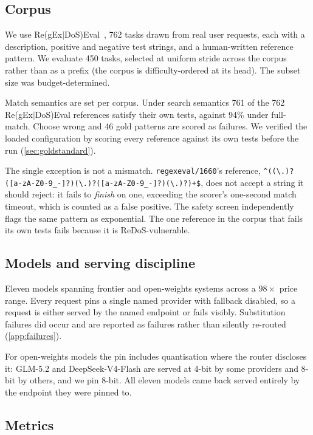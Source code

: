 \documentclass[11pt]{article}
\begin{document}
\subsection{Corpus}

We use Re(gEx$|$DoS)Eval~\citep{siddiq2024regexeval}, 762 tasks drawn from real user
requests, each with a description, positive and negative test strings, and a
human-written reference pattern. We evaluate 450 tasks, selected at uniform
stride across the corpus rather than as a prefix (the corpus is
difficulty-ordered at its head). The subset size was budget-determined.

Match semantics are set per corpus. Under search semantics 761 of the 762
Re(gEx$|$DoS)Eval references satisfy their own tests, against 94\% under
full-match. Choose wrong and 46 gold patterns are scored as failures. We
verified the loaded configuration by scoring every reference against its own
tests before the run (\cref{sec:goldstandard}).

The single exception is not a mismatch. \texttt{regexeval/1660}'s reference,
\lstinline!^((\.)?([a-zA-Z0-9_-]?)(\.)?([a-zA-Z0-9_-]?)(\.)?)+$!, does not
accept a string it should reject: it fails to \emph{finish} on one, exceeding
the scorer's one-second match timeout, which is counted as a false positive.
The safety screen independently flags the same pattern as exponential. The one
reference in the corpus that fails its own tests fails because it is
ReDoS-vulnerable.

\subsection{Models and serving discipline}
\label{sec:serving}

Eleven models spanning frontier and open-weights systems across a $98\times$
price range. Every request pins a single named provider with fallback
disabled, so a request is either served by the named endpoint or fails
visibly. Substitution failures did occur and are reported as failures rather
than silently re-routed (\cref{app:failures}).

For open-weights models the pin includes quantisation where the router
discloses it: GLM-5.2 and DeepSeek-V4-Flash are served at 4-bit by some
providers and 8-bit by others, and we pin 8-bit. All eleven models came back
served entirely by the endpoint they were pinned to.

\subsection{Metrics}
\label{sec:metrics}
\end{document}
